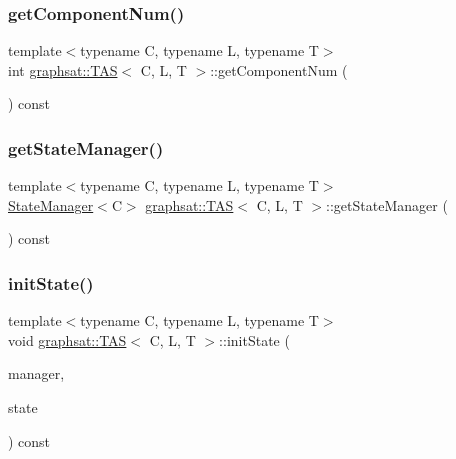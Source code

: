 \subsubsection{\texorpdfstring{getComponentNum()}{getComponentNum()}}
{\footnotesize\ttfamily template$<$typename C, typename L, typename T$>$ \\
int \mbox{\hyperlink{classgraphsat_1_1_t_a_s}{graphsat\+::\+T\+AS}}$<$ C, L, T $>$\+::get\+Component\+Num (\begin{DoxyParamCaption}{ }\end{DoxyParamCaption}) const\hspace{0.3cm}{\ttfamily [inline]}}

\mbox{\label{classgraphsat_1_1_t_a_s_aa41dff4842c8b559c77d87ff2b497438}} 
\subsubsection{\texorpdfstring{getStateManager()}{getStateManager()}}
{\footnotesize\ttfamily template$<$typename C, typename L, typename T$>$ \\
\mbox{\hyperlink{classgraphsat_1_1_state_manager}{State\+Manager}}$<$C$>$ \mbox{\hyperlink{classgraphsat_1_1_t_a_s}{graphsat\+::\+T\+AS}}$<$ C, L, T $>$\+::get\+State\+Manager (\begin{DoxyParamCaption}{ }\end{DoxyParamCaption}) const\hspace{0.3cm}{\ttfamily [inline]}}

\mbox{\label{classgraphsat_1_1_t_a_s_a0db4b452d57fd2096eb7a5fb4e221dc7}} 
\subsubsection{\texorpdfstring{initState()}{initState()}}
{\footnotesize\ttfamily template$<$typename C, typename L, typename T$>$ \\
void \mbox{\hyperlink{classgraphsat_1_1_t_a_s}{graphsat\+::\+T\+AS}}$<$ C, L, T $>$\+::init\+State (\begin{DoxyParamCaption}\item[{const \mbox{\hyperlink{classgraphsat_1_1_state_manager}{State\+Manager}}$<$ C $>$ \&}]{manager,  }\item[{\mbox{\hyperlink{classgraphsat_1_1_t_a_s_a21e6a612eebc293b90e198d4adf25f0f}{State\+\_\+t}} $\ast$}]{state }\end{DoxyParamCaption}) const\hspace{0.3cm}{\ttfamily [inline]}}

